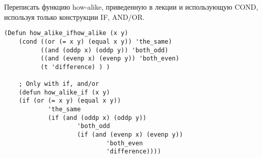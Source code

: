 Переписать функцию how-alike, приведенную в лекции и использующую COND, используя
только конструкции IF, AND/OR.
\begin{center}
    \captionsetup{justification=raggedright,singlelinecheck=off}
    \begin{lstlisting}[label=lst:task_9,caption=Код функций]
    (Defun how_alike_ifhow_alike (x y)
    (cond ((or (= x y) (equal x y)) 'the_same)
          ((and (oddp x) (oddp y)) 'both_odd)
          ((and (evenp x) (evenp y)) 'both_even)
          (t 'difference) ) )
    
    ; Only with if, and/or
    (defun how_alike_if (x y)
    (if (or (= x y) (equal x y))
            'the_same
            (if (and (oddp x) (oddp y))
                    'both_odd
                    (if (and (evenp x) (evenp y))
                            'both_even
                            'difference))))
\end{lstlisting}
\end{center}